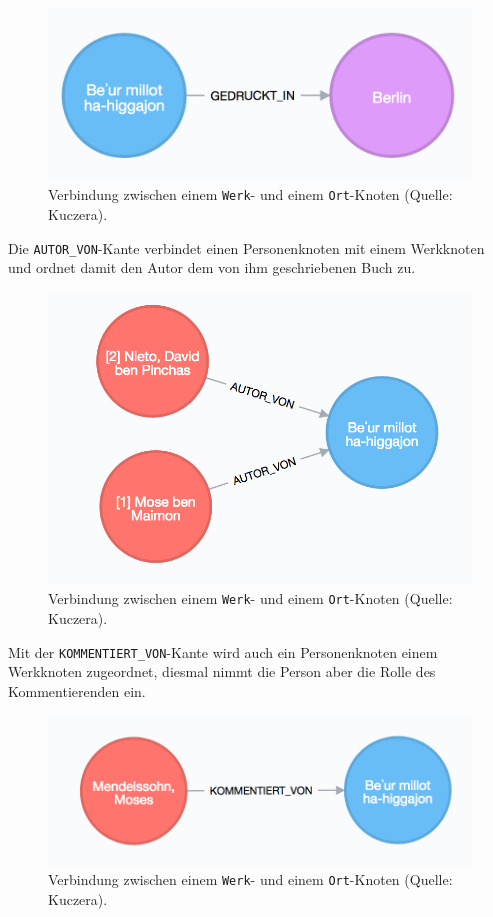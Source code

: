 \documentclass[ngerman,]{scrreprt}
\begin{document}
\begin{figure}
\centering
\includegraphics{Bilder/Werk-Ort.png}
\caption{Verbindung zwischen einem \texttt{Werk}- und einem \texttt{Ort}-Knoten (Quelle: Kuczera).}
\end{figure}

Die \texttt{AUTOR\_VON}-Kante verbindet einen Personenknoten mit einem Werkknoten und ordnet damit den Autor dem von ihm geschriebenen Buch zu.

\begin{figure}
\centering
\includegraphics{Bilder/Werk-Autor.png}
\caption{Verbindung zwischen einem \texttt{Werk}- und einem \texttt{Ort}-Knoten (Quelle: Kuczera).}
\end{figure}

Mit der \texttt{KOMMENTIERT\_VON}-Kante wird auch ein Personenknoten einem Werkknoten zugeordnet, diesmal nimmt die Person aber die Rolle des Kommentierenden ein.

\begin{figure}
\centering
\includegraphics{Bilder/Werk-Kommentator.png}
\caption{Verbindung zwischen einem \texttt{Werk}- und einem \texttt{Ort}-Knoten (Quelle: Kuczera).}
\end{figure}
\end{document}
